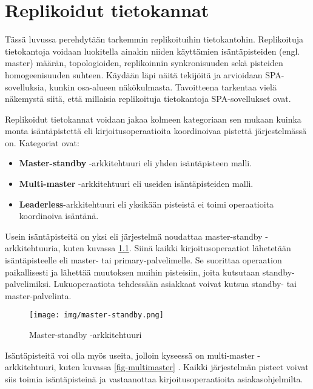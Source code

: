\documentclass[finnish,twoside,censored,csm,sw-track-2018]{HYthesisML}
\begin{document}
\chapter{Replikoidut tietokannat}
\label{sec-arkkitehtuurit-teoria}

Tässä luvussa perehdytään tarkemmin replikoituihin tietokantohin. Replikoituja tietokantoja voidaan luokitella ainakin niiden käyttämien isäntäpisteiden (engl. master) määrän, topologioiden, replikoinnin synkronisuuden sekä pisteiden homogeenisuuden suhteen. Käy\-dään läpi näitä tekijöitä ja arvioidaan SPA-sovelluksia, kunkin osa-alueen näkökulmasta. Tavoitteena tarkentaa vielä näkemystä siitä, että millaisia replikoituja tietokantoja SPA-sovellukset ovat.


Replikoidut tietokannat voidaan jakaa kolmeen kategoriaan sen mukaan kuinka monta isäntäpistettä eli kirjoitusoperaatioita koordinoivaa pistettä järjestelmässä on. Kategoriat \citep{Kleppmann} ovat:

\begin{itemize}[topsep=2pt,itemsep=1pt]
    \item \textbf{Master-standby} -arkkitehtuuri eli yhden isäntäpisteen malli.
    \item \textbf{Multi-master} -arkkitehtuuri eli useiden isäntäpisteiden malli.
    \item \textbf{Leaderless}-arkkitehtuuri eli yksikään pisteistä ei toimi operaatioita koordinoiva isäntänä.
\end{itemize}

Usein isäntäpisteitä on yksi eli järjestelmä noudattaa master-standby -arkkitehtuuria, kuten kuvassa \ref{fig-masterstandby}\citep{Kleppmann}. Siinä kaikki kirjoitusoperaatiot lähetetään isäntäpisteelle eli master- tai primary-palvelimelle. Se suorittaa operaation paikallisesti ja lähettää muutoksen muihin pisteisiin, joita kutsutaan standby-palvelimiksi. Lukuoperaatiota tehdessään asiakkaat voivat kutsua standby- tai master-palvelinta.

\begin{figure}[ht]
  \centering
    \texttt{[image: img/master-standby.png]}
  \caption{Master-standby -arkkitehtuuri}
  \label{fig-masterstandby}
\end{figure}

\clearpage

Isäntäpisteitä voi olla myös useita, jolloin kyseessä on multi-master -arkkitehtuuri, kuten kuvassa \ref{fig-multimaster} \citep{Kleppmann}. Kaikki järjestelmän pisteet voivat siis toimia isäntäpisteinä ja vastaanottaa kirjoitusoperaatioita asiakasohjelmilta.
\end{document}
